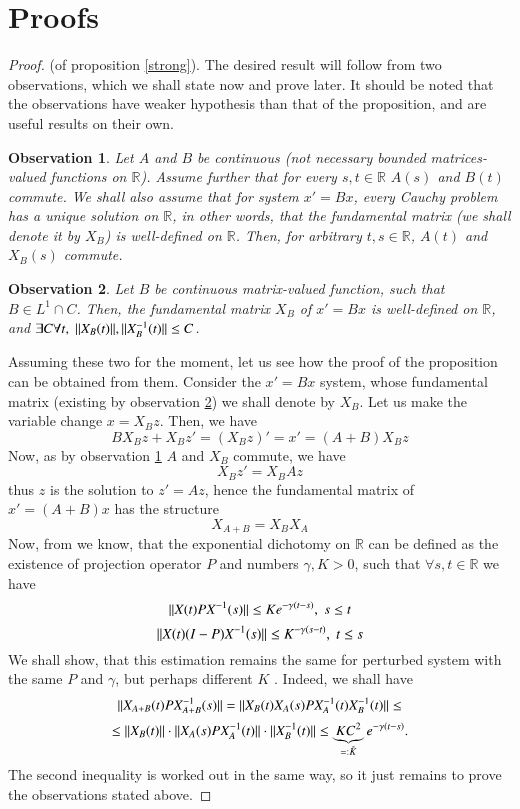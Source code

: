 \documentclass{elsarticle}
\newtheorem{observation}{Observation}
\theoremstyle{remark}
\begin{document}
\section{Proofs}
\begin{proof}{(of proposition \ref{strong}).\;}
The desired result will follow from two observations, which we shall state now and prove later. It should be noted that the observations have
weaker hypothesis than that of the proposition, and are useful results on their own.
\begin{observation}\label{Hard}Let $A$ and $B$ be continuous (not necessary bounded matrices-valued functions on $\mathbb{R}$). Assume further
that for every $s,t\in\mathbb{R}$ $A(s)$ and $B(t)$ commute. We shall also assume that for system $x'=Bx$, every Cauchy problem has a unique
solution on $\mathbb{R}$, in other words, that the fundamental matrix (we shall denote it by $X_B$) is well-defined on $\mathbb{R}$. Then,
for arbitrary $t,s\in\mathbb{R}$, $A(t)$ and $X_B(s)$ commute.
\end{observation}
\begin{observation}\label{Easy}Let $B$ be continuous matrix-valued function, such that $B\in L^1\cap C$. Then,
the fundamental matrix $X_B$ of $x'=Bx$ is well-defined on $\mathbb{R}$, and $\exists C\forall t,\;\|X_B(t)\|,\|X^{-1}_B
(t)\|\leq C$.
\end{observation}
Assuming these two for the moment, let us see how the proof of the proposition can be obtained from them. Consider the $x'=Bx$ system, whose
fundamental matrix (existing by observation \ref{Easy}) we shall denote by $X_B$. Let us make the variable change $x=X_Bz$. Then, we have
\[BX_Bz+X_Bz'=(X_Bz)'=x'=(A+B)X_Bz\]
Now, as by observation \ref{Hard} $A$ and $X_B$ commute, we have
\[X_Bz'=X_BAz\]
thus $z$ is the solution to $z'=Az$, hence the fundamental matrix of $x'=(A+B)x$ has the structure
\[X_{A+B}=X_BX_A\]
Now, from \cite{coppel1978dichotomies} we know, that the exponential dichotomy on $\mathbb{R}$ can be defined as the existence of projection operator $P$
and numbers $\gamma,K>0$, such that $\forall s,t\in\mathbb{R}$ we have
\[\|X(t)PX^{-1}(s)\|\leq Ke^{-\gamma(t-s)},\;s\leq t\]
\[\|X(t)(I-P)X^{-1}(s)\|\leq K^{-\gamma(s-t)},\;t\leq s\]
We shall show, that this estimation remains the same for perturbed system  with the same $P$ and $\gamma$, but perhaps different $K$
. Indeed, we shall have
\[\|X_{A+B}(t)PX^{-1}_{A+B}(s)\|=\|X_B(t)X_A(s)PX^{-1}_A(t)X^{-1}_B(t)\|\leq\]
\[\leq\|X_B(t)\|\cdot\|X_A(s)PX^{-1}_A(t)\|\cdot\|X^{-1}_B(t)\|\leq \underbrace{KC^2}_{=:\tilde{K}}e^{-\gamma(t-s)}.\]
The second inequality is worked out in the same way, so it just remains to prove the observations stated above.
\end{proof}
\end{document}
